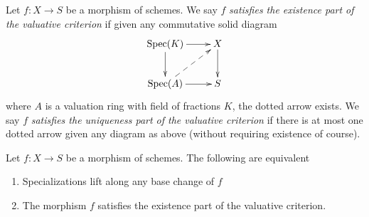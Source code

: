 \begin{definition}
\label{definition-valuative-criterion}
Let $f : X \to S$ be a morphism of schemes. We say $f$
{\it satisfies the existence part of the valuative criterion}
if given any commutative solid diagram
$$
\xymatrix{
\text{Spec}(K) \ar[r] \ar[d] & X \ar[d] \\
\text{Spec}(A) \ar[r] \ar@{-->}[ru] & S
}
$$
where $A$ is a valuation ring with field of fractions $K$, the
dotted arrow exists. We say $f$ {\it satisfies the uniqueness
part of the valuative criterion} if there is at most one
dotted arrow given any diagram as above (without requiring
existence of course).
\end{definition}

\begin{lemma}
\label{lemma-lift-specializations-valuative}
Let $f : X \to S$ be a morphism of schemes.
The following are equivalent
\begin{enumerate}
\item Specializations lift along any base change of $f$
\item The morphism $f$ satisfies the existence part of the
valuative criterion.
\end{enumerate}
\end{lemma}

